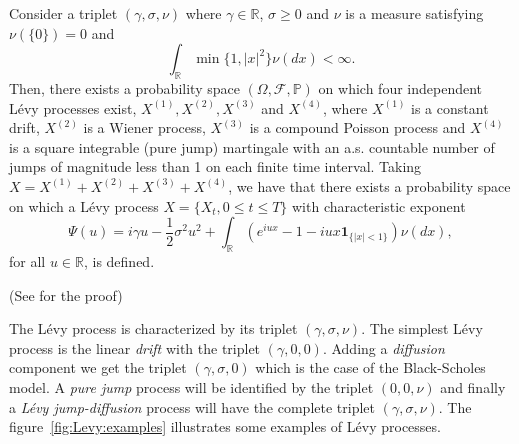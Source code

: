 \begin{thm}
Consider a triplet $(\gamma,\sigma,\nu)$ where $\gamma\in\mathbb{R}$, $\sigma\geq 0$ and $\nu$ is a measure satisfying $\nu(\{0\}) = 0$ and
$$\int_\mathbb{R} \min\{1,|x|^2\}\nu(dx)<\infty.$$
Then, there exists a probability space $(\Omega,\mathcal{F},\mathbb{P})$ on which four independent L\'evy processes exist, $X^{(1)},X^{(2)},X^{(3)}$ and $X^{(4)}$, where $X^{(1)}$ is a constant drift, $X^{(2)}$ is a Wiener process, $X^{(3)}$ is a compound Poisson process and $X^{(4)}$ is a square integrable (pure jump) martingale with an a.s. countable number of jumps of magnitude less than 1 on each finite time interval. Taking $X = X^{(1)}+X^{(2)}+X^{(3)}+X^{(4)}$, we have that there exists a probability space on which a L\'evy process $X = \{X_t,0\leq t \leq T\}$ with characteristic exponent
$$\Psi(u) = i\gamma u -\frac{1}{2}\sigma^2u^2+\int_\mathbb{R}\left(e^{iux}-1-iux\mathbf{1}_{\{|x|<1\}}\right)\nu(dx),$$
for all $u\in\mathbb{R}$, is defined.
\end{thm}
(See \citeauthor{Kyp06} \citeyearpar{Kyp06} \cite{Kyp06} for the proof)


The L\'evy process is characterized by its triplet $(\gamma,\sigma,\nu)$. The simplest L\'evy process is the linear \textit{drift} with the triplet $(\gamma,0,0)$. Adding a \textit{diffusion} component we get the triplet $(\gamma,\sigma,0)$ which is the case of the Black-Scholes model. A \textit{pure jump} process will be identified by the triplet $(0,0,\nu)$ and finally a \textit{L\'evy jump-diffusion} process will have the complete triplet $(\gamma,\sigma,\nu)$. The figure~\ref{fig:Levy:examples} illustrates some examples of L\'evy processes.

